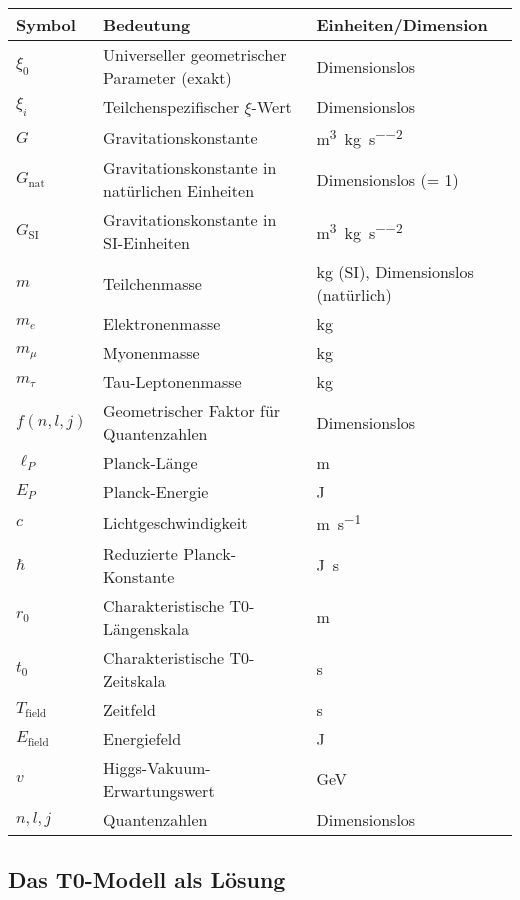 \documentclass[12pt,a4paper]{article}
\newcommand{\xifunc}{f(n,l,j)}
\newcommand{\Gsi}{G_{\text{SI}}}
\newcommand{\Gnat}{G_{\text{nat}}}
\theoremstyle{definition}
\begin{document}
	\begin{center}
		\begin{tabular}{lll}
			\toprule
			\textbf{Symbol} & \textbf{Bedeutung} & \textbf{Einheiten/Dimension} \\
			\midrule
			$\xi_0$ & Universeller geometrischer Parameter (exakt) & Dimensionslos \\
			$\xi_i$ & Teilchenspezifischer $\xi$-Wert & Dimensionslos \\
			$G$ & Gravitationskonstante & \si{\metre\cubed\per\kilogram\per\second\squared} \\
			$\Gnat$ & Gravitationskonstante in natürlichen Einheiten & Dimensionslos (= 1) \\
			$\Gsi$ & Gravitationskonstante in SI-Einheiten & \si{\metre\cubed\per\kilogram\per\second\squared} \\
			$m$ & Teilchenmasse & \si{\kilogram} (SI), Dimensionslos (natürlich) \\
			$m_e$ & Elektronenmasse & \si{\kilogram} \\
			$m_\mu$ & Myonenmasse & \si{\kilogram} \\
			$m_\tau$ & Tau-Leptonenmasse & \si{\kilogram} \\
			$\xifunc$ & Geometrischer Faktor für Quantenzahlen & Dimensionslos \\
			$\ell_P$ & Planck-Länge & \si{\metre} \\
			$E_P$ & Planck-Energie & \si{\joule} \\
			$c$ & Lichtgeschwindigkeit & \si{\metre\per\second} \\
			$\hbar$ & Reduzierte Planck-Konstante & \si{\joule\second} \\
			$r_0$ & Charakteristische T0-Längenskala & \si{\metre} \\
			$t_0$ & Charakteristische T0-Zeitskala & \si{\second} \\
			$T_{\text{field}}$ & Zeitfeld & \si{\second} \\
			$E_{\text{field}}$ & Energiefeld & \si{\joule} \\
			$v$ & Higgs-Vakuum-Erwartungswert & \si{\giga\electronvolt} \\
			$n,l,j$ & Quantenzahlen & Dimensionslos \\
			\bottomrule
		\end{tabular}
	\end{center}
	
	\subsection{Das T0-Modell als Lösung}
	
\end{document}
